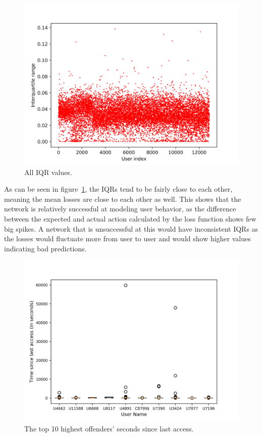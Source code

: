 \begin{figure}
	\begin{center}
		\includegraphics[scale=1.6]{results/iqrs}
	\end{center}
	\caption{All IQR values.~\label{fig:iqrs}}
\end{figure}

As can be seen in figure~\ref{fig:iqrs}, the IQRs tend to be fairly close to each other, meaning the mean losses are close to each other as well. This shows that the network is relatively successful at modeling user behavior, as the difference between the expected and actual action calculated by the loss function shows few big spikes. A network that is unsuccessful at this would have inconsistent IQRs as the losses would fluctuate more from user to user and would show higher values indicating bad predictions.

\begin{figure}
	\begin{center}
		\includegraphics[scale=1.6]{results/highest_offender_time_since_last_access}
	\end{center}
	\caption{The top 10 highest offenders' seconds since last access.~\label{fig:time_since_last_access}}
\end{figure}

